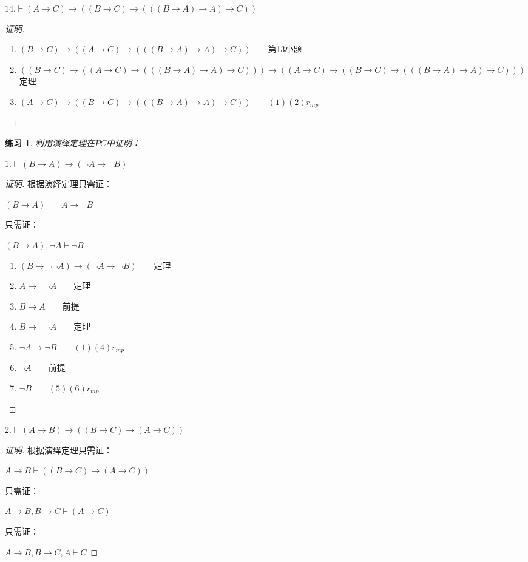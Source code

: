 \documentclass{article}
\newtheorem{Exercise}{练习}
\begin{document}
\begin{CJK*}{UTF8}{gbsn}
$14.\vdash (A\to C)\to ((B\to C)\to (((B\to A)\to A)\to C))$

\begin{proof}[证明]
  $\qquad$

  \begin{enumerate}
    \item $(B\to C)\to ((A\to C)\to (((B\to A)\to A)\to C))\qquad$第13小题
    \item $((B\to C)\to ((A\to C)\to (((B\to A)\to A)\to C)))\to ((A\to C)\to ((B\to C)\to (((B\to A)\to A)\to C)))\qquad$定理
    \item $(A\to C)\to ((B\to C)\to (((B\to A)\to A)\to C))\qquad(1)(2)r_{mp}$
  \end{enumerate}

\end{proof}
\begin{Exercise}
  利用演绎定理在$PC$中证明：
\end{Exercise}

$1.\vdash (B\to A)\to (\lnot A\to \lnot B)$
\begin{proof}[证明]
  根据演绎定理只需证：
  
  $(B\to A)\vdash \lnot A\to \lnot B$

  只需证：

  $(B\to A), \lnot A\vdash\lnot B$



\begin{enumerate}
  \item $(B\to \lnot\lnot A)\to (\lnot A\to \lnot B)\qquad$定理
  \item $A\to \lnot\lnot A\qquad$定理
  \item $B\to A\qquad$前提
  \item $B\to \lnot\lnot A\qquad$定理
  \item $\lnot A\to \lnot B\qquad(1)(4)r_{mp}$
  \item $\lnot A\qquad$前提
  \item $\lnot B\qquad (5)(6)r_{mp}$
\end{enumerate}
\end{proof}
$2.\vdash (A\to B)\to ((B\to C)\to (A\to C))$
\begin{proof}[证明]
  根据演绎定理只需证：
  
  $A\to B\vdash ((B\to C)\to (A\to C))$

  只需证：

  $A\to B, B\to C\vdash (A\to C)$

  只需证：

  $A\to B, B\to C, A\vdash C$


\end{proof}
\end{CJK*}
\end{document}
